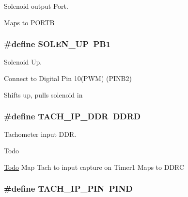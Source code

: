 Solenoid output Port. 

Maps to P\-O\-R\-T\-B \hypertarget{group__port_defs_gaeacdff688cfbf944da03e3c972f878f0}{
\subsubsection[{S\-O\-L\-E\-N\-\_\-\-U\-P}]{\setlength{\rightskip}{0pt plus 5cm}\#define {\bf S\-O\-L\-E\-N\-\_\-\-U\-P}~P\-B1}}\label{group__port_defs_gaeacdff688cfbf944da03e3c972f878f0}


Solenoid Up. 


\begin{DoxyItemize}
\item Connect to Digital Pin 10(P\-W\-M) (P\-I\-N\-B2)
\begin{DoxyItemize}
\item Shifts up, pulls solenoid in 
\end{DoxyItemize}
\end{DoxyItemize}\hypertarget{group__port_defs_ga9eefb2c9faab81c342d44226ab78e512}{
\subsubsection[{T\-A\-C\-H\-\_\-\-I\-P\-\_\-\-D\-D\-R}]{\setlength{\rightskip}{0pt plus 5cm}\#define {\bf T\-A\-C\-H\-\_\-\-I\-P\-\_\-\-D\-D\-R}~D\-D\-R\-D}}\label{group__port_defs_ga9eefb2c9faab81c342d44226ab78e512}


Tachometer input D\-D\-R. 

\begin{DoxyRefDesc}{Todo}
\item[\hyperlink{todo__todo000001}{Todo}]Map Tach to input capture on Timer1 Maps to D\-D\-R\-C \end{DoxyRefDesc}
\hypertarget{group__port_defs_ga10298a14d4cfb65c0f404afcada4fa00}{
\subsubsection[{T\-A\-C\-H\-\_\-\-I\-P\-\_\-\-P\-I\-N}]{\setlength{\rightskip}{0pt plus 5cm}\#define {\bf T\-A\-C\-H\-\_\-\-I\-P\-\_\-\-P\-I\-N}~P\-I\-N\-D}}\label{group__port_defs_ga10298a14d4cfb65c0f404afcada4fa00}


